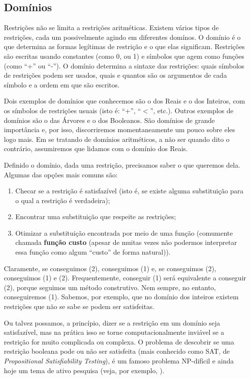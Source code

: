 \documentclass{article}
\theoremstyle{remark}
\theoremstyle{theorem}
\begin{document}
\subsection{Domínios}

Restrições não se limita a restrições aritméticas. Existem vários tipos de restrições, cada um possivelmente agindo em diferentes domínos.
O domínio é o que determina as formas legítimas de restrição e o que elas significam. Restrições são escritas usando constantes (como 0, ou 1) e símbolos que agem como funções (como ``+'' ou ``-''). O domínio determina a sintaxe das restrições: quais símbolos de restrições podem ser usados, quais e quantos são os argumentos de cada símbolo e a ordem em que são escritos.

Dois exemplos de domínios que conhecemos são o dos Reais e o dos Inteiros, com os símbolos de restrições usuais (isto é: ``+'', ``$<$'', etc.). Outros exemplos de domínios são o das Árvores e o dos Booleanos. São domínios de grande importância e, por isso, discorriremos momentaneamente um pouco sobre eles logo mais. Em se tratando de domínios aritméticos, a não ser quando dito o contrário, assumiremos que lidamos com o domínio dos Reais.

Definido o domínio, dada uma restrição, precisamos saber o que queremos dela. Algumas das opções mais comuns são:
  \begin{enumerate}
    \item Checar se a restrição é satisfazível (isto é, se existe alguma substituição para o qual a restrição é verdadeira);
    \item Encontrar uma substituição que respeite as restrições;
    \item Otimizar a substituição encontrada por meio de uma função (comumente chamada \textbf{função custo} (apesar de muitas vezes não podermos interpretar essa função como algum ``custo'' de forma natural)).
  \end{enumerate}

  Claramente, se conseguimos (2), conseguimos (1) e, se conseguimos (2), conseguimos (1) e (2). Frequentemente, conseguir (1) será equivalente a conseguir (2), porque seguimos um método construtivo. Nem sempre, no entanto, conseguiremos (1). Sabemos, por exemplo, que no domínio dos inteiros existem restrições que não se sabe se podem ser satisfeitas.

  Ou talvez possamos, a princípio, dizer se a restrição em um domínio seja satisfazível, mas na prática isso se torne computacionalmente inviável se a
restrição for muito complicada ou complexa. O problema de descobrir se uma restrição booleana pode ou não ser satisfeita (mais conhecido como SAT, de \textit{Propositional Satisfiability Testing}), é um famoso problema NP-difícil e ainda hoje um tema de ativo pesquisa (veja, por exemplo, \cite{sat}).
\end{document}
